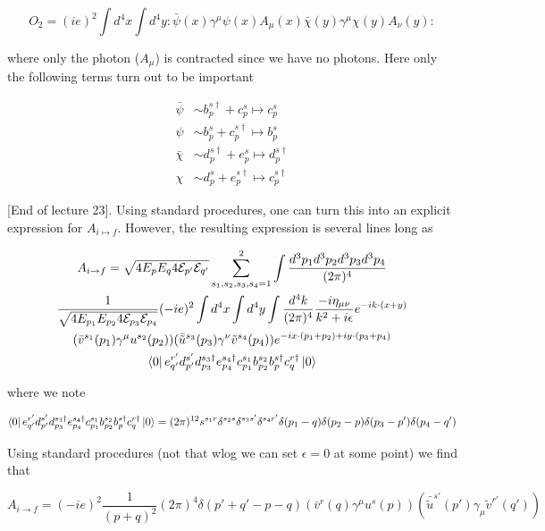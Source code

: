 \documentclass{article}
\theoremstyle{definition}
\begin{document}
$$ O_2 = (i e)^2 \int d^4x \int d^4y : \bar{\psi}(x) \gamma^\mu \psi(x) A_\mu(x)
\bar{\chi}(y) \gamma^\mu \chi(y) A_\nu(y): $$

where only the photon ($A_\mu$) is contracted since we have no photons. Here
only the following terms turn out to be important

\begin{align*}
\bar{\psi} &\sim b_p^{s \dagger} + c_p^s \mapsto c_p^s \\
\psi &\sim b_p^s + c_p^{s \dagger} \mapsto b_p^s \\
\bar{\chi} &\sim d_p^{s \dagger} + e_p^s \mapsto d_p^{s \dagger} \\
\chi &\sim d_p^s + e_p^{s \dagger} \mapsto c_p^{s \dagger}
\end{align*}

[End of lecture 23]. Using standard procedures, one can turn this into an
explicit expression for $A_{i \mapsto f}$. However, the resulting expression is
several lines long as

\begin{multline*}
  A_{i \to f} = \sqrt{4E_p E_q 4 \mathcal{E}_{p'} \mathcal{E}_{q'}} \sum_{s_1,
    s_2, s_3, s_4 = 1}^2 \int \frac{d^3p_1 d^3p_2 d^3p_3 d^3p_4}{(2\pi)^4} \\
  \frac{1}{\sqrt{4 E_{p_1} E_{p_2} 4 \mathcal{E}_{p_3} \mathcal{E}_{p_4}}}
  (-ie)^2 \int d^4x \int d^4y \int \frac{d^4k}{(2\pi)^4} \frac{-i \eta_{\mu
      \nu}}{k^2 + i \epsilon} e^{-ik \cdot (x + y)} \\
(\bar{v}^{s_1}(p_1) \gamma^\mu u^{s_2}(p_2)) (\bar{\tilde{u}}^{s_3}(p_3)
\gamma^\nu \tilde{v}^{s_4}(p_4)) e^{-ix \cdot (p_1 + p_2) + iy \cdot (p_3 +
  p_4)} \\
\bra{0} e_{q'}^{r'} d_{p'}^{s'} d_{p_3}^{s_3 \dagger} e_{p_4}^{s_4 \dagger}
c_{p_1}^{s_1} b_{p_2}^{s_2} b_p^{s \dagger} c_q^{r \dagger} \ket{0}
\end{multline*}

where we note

$$ 
\bra{0} e_{q'}^{r'} d_{p'}^{s'} d_{p_3}^{s_3 \dagger} e_{p_4}^{s_4 \dagger}
c_{p_1}^{s_1} b_{p_2}^{s_2} b_p^{s \dagger} c_q^{r \dagger} \ket{0}
= (2\pi)^{12} s^{s_1 r} \delta^{s_2 s} \delta^{s_3 s'} \delta^{s_4 r'}
\delta(p_1 - q) \delta(p_2 - p) \delta(p_3 - p') \delta(p_4 - q') $$

Using standard procedures (not that wlog we can set $\epsilon = 0$ at some
point) we find that

$$ A_{i \to f} = (-ie)^2 \frac{1}{(p + q)^2} (2\pi)^4 \delta(p' + q' - p - q)
(\bar{v}^r(q) \gamma^\mu u^s(p)) (\bar{\tilde{u}}^{s'}(p') \gamma_\mu
\tilde{v}^{r'}(q')) $$
\end{document}
